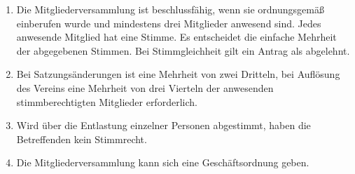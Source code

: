 \documentclass[11pt]{article}
\begin{document}
\begin{enumerate}[label=\arabic*)]
	\item Die Mitgliederversammlung ist beschlussfähig, wenn sie ordnungsgemäß einberufen wurde und mindestens drei Mitglieder anwesend sind. Jedes anwesende Mitglied hat eine Stimme. Es entscheidet die einfache Mehrheit der abgegebenen Stimmen. Bei Stimmgleichheit gilt ein Antrag als abgelehnt.
	\item Bei Satzungsänderungen ist eine Mehrheit von zwei Dritteln, bei Auflösung des Vereins eine Mehrheit von drei Vierteln der anwesenden stimmberechtigten Mitglieder erforderlich.
	\item Wird über die Entlastung einzelner Personen abgestimmt, haben die Betreffenden kein Stimmrecht.
	\item Die Mitgliederversammlung kann sich eine Geschäftsordnung geben.
\end{enumerate}
\end{document}
